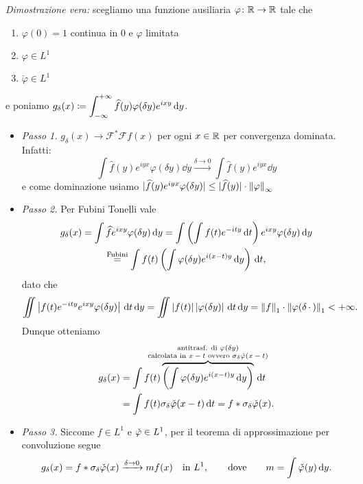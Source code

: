 \textit{Dimostrazione vera:} scegliamo una funzione ausiliaria $\varphi \colon \mathbb R \to \mathbb R$ tale che
\begin{enumerate}
	\item $\varphi(0) = 1$ continua in $0$ e $\varphi$ limitata
	\item $\varphi \in L^1$
	\item $\check\varphi \in L^1$
\end{enumerate}
e poniamo $g_\delta(x) \coloneqq \displaystyle \int_{-\infty}^{+\infty} \widehat f(y) \varphi(\delta y) e^{ixy} \,\mathrm{d} y$.
\begin{itemize}
	\item \textit{Passo 1.}
		$g_\delta(x) \to \mathcal F^* \mathcal F f(x)$ per ogni $x \in \mathbb R$ per convergenza dominata. Infatti:
		$$
			\int \hat f(y) e^{iyx} \varphi(\delta y) \dd y \xrightarrow{\delta \to 0} 
			\int \hat f(y) e^{iyx} \dd y
		$$
		e come dominazione usiamo $|\widehat f(y) e^{iyx} \varphi(\delta y)| \leq |\widehat f(y)| \cdot \left\lVert \varphi \right\rVert_\infty$

	\item \textit{Passo 2.} Per Fubini Tonelli vale 
		\begin{multline*}
			g_\delta(x) = \int \widehat{f} e^{ixy} \varphi(\delta y) \,\mathrm{d} y = \int \left( \int f(t) e^{-ity} \,\mathrm{d} t \right) e^{ixy} \varphi(\delta y) \,\mathrm{d} y \\
			\overset{\text{Fubini}}{=} \int f(t) \left( \int \varphi(\delta y) e^{i(x-t)y} \,\mathrm{d} y \right) \,\mathrm{d} t,
		\end{multline*}
		dato che
		$$
			\iint \left| f(t) e^{-ity} e^{ixy} \varphi(\delta y) \right| \,\mathrm{d} t \,\mathrm{d} y
			= \iint \left| f(t) \right| \left| \varphi(\delta y) \right| \,\mathrm{d} t \,\mathrm{d} y
			= \left\lVert f \right\rVert_1 \cdot \left\lVert \varphi(\delta \,\cdot\,) \right\rVert_1 < +\infty.
		$$
		Dunque otteniamo
		$$
		\begin{aligned}
			g_\delta(x) & = \int f(t) \overbrace{\left( \int \myphi(\delta y) e^{i(x-t)y} \dd y \right)}^{\mathclap{\substack{\text{antitrasf. di $\myphi(\delta y)$} \\ \text{calcolata in $x-t$ ovvero $\sigma_\delta \check{\myphi}(x-t)$}}}} \dd t \\
			& = \int f(t) \sigma_\delta \check{\myphi}(x-t) \dd t = f \ast \sigma_\delta \check{\myphi}(x).
		\end{aligned}
		$$

	\item \textit{Passo 3.} Siccome $f \in L^1$ e $\check {\varphi} \in L^1$, per il teorema di approssimazione per convoluzione segue
	$$
		g_\delta (x) = f \ast \sigma_\delta \check {\varphi}(x) \xrightarrow{\delta \to 0} mf(x) \quad \text{in } L^1, \qquad \text{dove} \qquad  m = \int \check {\varphi}(y) \,\mathrm{d} y.
	$$
	

\end{itemize}
